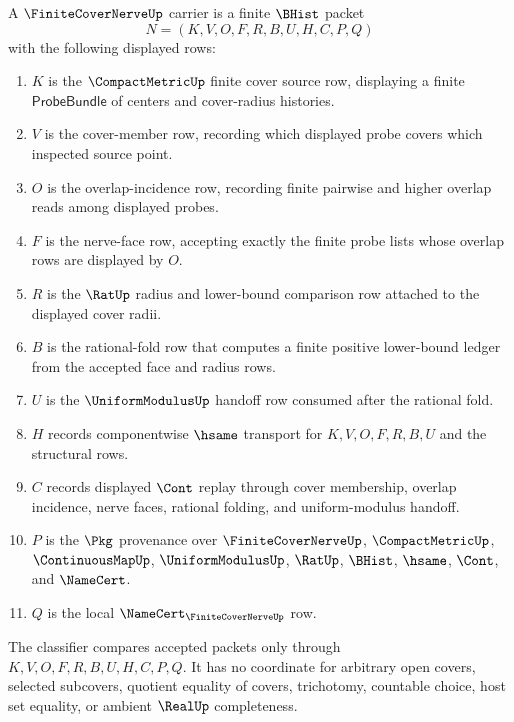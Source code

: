 \begin{definition}
\label{def:finite-cover-nerve-carrier}
A $\FiniteCoverNerveUp$ carrier is a finite $\BHist$ packet
$$
N=(K,V,O,F,R,B,U,H,C,P,Q)
$$
with the following displayed rows:
\begin{enumerate}
\item $K$ is the $\CompactMetricUp$ finite cover source row, displaying a finite $\mathsf{ProbeBundle}$ of centers and cover-radius histories.
\item $V$ is the cover-member row, recording which displayed probe covers which inspected source point.
\item $O$ is the overlap-incidence row, recording finite pairwise and higher overlap reads among displayed probes.
\item $F$ is the nerve-face row, accepting exactly the finite probe lists whose overlap rows are displayed by $O$.
\item $R$ is the $\RatUp$ radius and lower-bound comparison row attached to the displayed cover radii.
\item $B$ is the rational-fold row that computes a finite positive lower-bound ledger from the accepted face and radius rows.
\item $U$ is the $\UniformModulusUp$ handoff row consumed after the rational fold.
\item $H$ records componentwise $\hsame$ transport for $K,V,O,F,R,B,U$ and the structural rows.
\item $C$ records displayed $\Cont$ replay through cover membership, overlap incidence, nerve faces, rational folding, and uniform-modulus handoff.
\item $P$ is the $\Pkg$ provenance over $\FiniteCoverNerveUp$, $\CompactMetricUp$, $\ContinuousMapUp$, $\UniformModulusUp$, $\RatUp$, $\BHist$, $\hsame$, $\Cont$, and $\NameCert$.
\item $Q$ is the local $\NameCert_{\FiniteCoverNerveUp}$ row.
\end{enumerate}
The classifier compares accepted packets only through $K,V,O,F,R,B,U,H,C,P,Q$. It has no coordinate for arbitrary open covers, selected subcovers, quotient equality of covers, trichotomy, countable choice, host set equality, or ambient $\RealUp$ completeness.
\end{definition}

